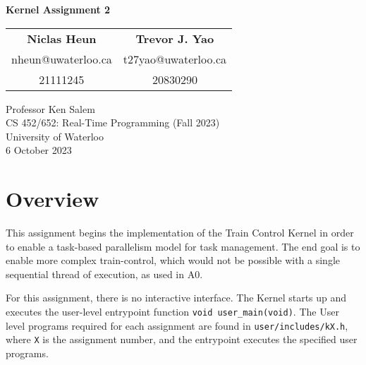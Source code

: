 \documentclass[12pt, titlepage]{article}
\begin{document}
    \begin{titlepage}
        \begin{center}
            \vspace*{5em}
            \textbf{\LARGE Kernel Assignment 2}
            \vspace*{3em}

            \begin{tabular}{c@{\hskip 8em}c}
                \textbf{\large Niclas Heun} & \textbf{\large Trevor J. Yao} \\
                {\small nheun@uwaterloo.ca} & {\small t27yao@uwaterloo.ca} \\
                {\footnotesize 21111245} & {\footnotesize 20830290} \\
            \end{tabular}

            \vfill

            Professor Ken Salem \\
            CS 452/652: Real-Time Programming (Fall 2023) \\
            University of Waterloo \\
            6 October 2023

            \vspace*{5em}

        \end{center}
    \end{titlepage}


    \pagestyle{fancy}

    \tableofcontents
    \pagebreak

    \section{Overview}
    \label{sec:overview}

    This assignment begins the implementation of the Train Control Kernel in order to enable a task-based parallelism model for task management. The end goal is to enable more complex train-control, which would not be possible with a single sequential thread of execution, as used in A0.

    For this assignment, there is no interactive interface. The Kernel starts up and executes the user-level entrypoint function \verb`void user_main(void)`. The User level programs required for each assignment are found in \verb`user/includes/kX.h`, where \verb`X` is the assignment number, and the entrypoint executes the specified user programs.
\end{document}
